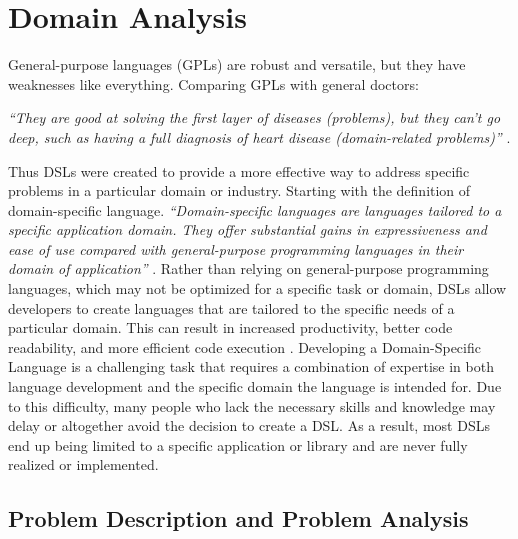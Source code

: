 \chapter{Domain Analysis}
General-purpose languages (GPLs) are robust and versatile, but they have weaknesses like everything. Comparing GPLs with general doctors:

\emph{“They are good at solving the first layer of diseases (problems), but they can’t go deep, such as having a full diagnosis of heart disease (domain-related problems)”} \cite{alves}.

Thus DSLs were created to provide a more effective way to address specific problems in a particular domain or industry. Starting with the definition of domain-specific language. \emph{“Domain-specific languages are languages tailored to a specific application domain. They offer substantial gains in expressiveness and ease of use compared with general-purpose programming languages in their domain of application”} \cite{mernik}.
Rather than relying on general-purpose programming languages, which may not be optimized for a specific task or domain, DSLs allow developers to create languages that are tailored to the specific needs of a particular domain. This can result in increased productivity, better code readability, and more efficient code execution \cite{jetbrains}.
Developing a Domain-Specific Language is a challenging task that requires a combination of expertise in both language development and the specific domain the language is intended for. Due to this difficulty, many people who lack the necessary skills and knowledge may delay or altogether avoid the decision to create a DSL. As a result, most DSLs end up being limited to a specific application or library and are never fully realized or implemented. \par





\section{Problem Description and Problem Analysis}

